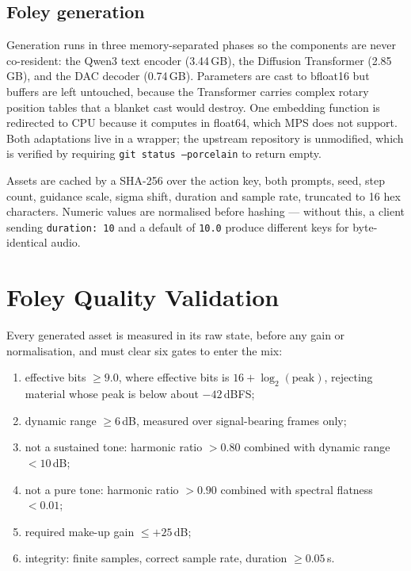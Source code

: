 \documentclass[conference]{IEEEtran}
\begin{document}
\subsection{Foley generation}
\label{sec:phases}

Generation runs in three memory-separated phases so the components are never
co-resident: the Qwen3 text encoder (3.44\,GB), the Diffusion Transformer
(2.85\,GB), and the DAC decoder (0.74\,GB). Parameters are cast to bfloat16 but
buffers are left untouched, because the Transformer carries complex rotary
position tables that a blanket cast would destroy. One embedding function is
redirected to CPU because it computes in float64, which MPS does not support.
Both adaptations live in a wrapper; the upstream repository is unmodified, which
is verified by requiring \texttt{git status --porcelain} to return empty.

Assets are cached by a SHA-256 over the action key, both prompts, seed, step
count, guidance scale, sigma shift, duration and sample rate, truncated to 16 hex
characters. Numeric values are normalised before hashing --- without this, a
client sending \texttt{duration: 10} and a default of \texttt{10.0} produce
different keys for byte-identical audio.

\section{Foley Quality Validation}
\label{sec:gate}

Every generated asset is measured in its raw state, before any gain or
normalisation, and must clear six gates to enter the mix:

\begin{enumerate}
\item effective bits $\geq 9.0$, where effective bits is
      $16 + \log_2(\mathrm{peak})$, rejecting material whose peak is below
      about $-42$\,dBFS;
\item dynamic range $\geq 6$\,dB, measured over signal-bearing frames only;
\item not a sustained tone: harmonic ratio $> 0.80$ combined with dynamic
      range $< 10$\,dB;
\item not a pure tone: harmonic ratio $> 0.90$ combined with spectral
      flatness $< 0.01$;
\item required make-up gain $\leq +25$\,dB;
\item integrity: finite samples, correct sample rate, duration $\geq 0.05$\,s.
\end{enumerate}
\end{document}

